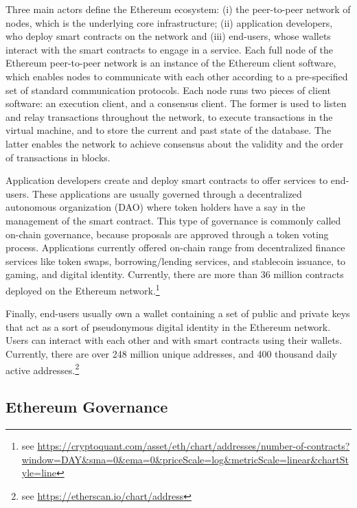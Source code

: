 \documentclass[No]{AEA}
\begin{document}
Three main actors define the Ethereum ecosystem: (i) the peer-to-peer network of nodes, which is the underlying core infrastructure; (ii) application developers, who deploy smart contracts on the network and (iii) end-users, whose wallets interact with the smart contracts to engage in a service.     
Each full node of the Ethereum peer-to-peer network is an instance of the Ethereum client software, which enables nodes to communicate with each other according to a pre-specified set of standard communication protocols. Each node runs two pieces of client software: an execution client, and a consensus client. The former is used to listen and relay transactions throughout the network, to execute transactions in the virtual machine, and to store the current and past state of the database. The latter enables the network to achieve consensus about the validity and the order of transactions in blocks. 

Application developers create and deploy smart contracts to offer services to end-users. These applications are usually governed through a decentralized autonomous organization (DAO) where token holders have a say in the management of the smart contract. This type of governance is commonly called on-chain governance, because proposals are approved through a token voting process. Applications currently offered on-chain range from decentralized finance services like token swaps, borrowing/lending services, and stablecoin issuance, to gaming, and digital identity. Currently, there are more than 36 million contracts deployed on the Ethereum network.\footnote{see \url{https://cryptoquant.com/asset/eth/chart/addresses/number-of-contracts?window=DAY&sma=0&ema=0&priceScale=log&metricScale=linear&chartStyle=line}}

Finally, end-users usually own a wallet containing a set of public and private keys that act as a sort of pseudonymous digital identity in the Ethereum network. Users can interact with each other and with smart contracts using their wallets. Currently, there are over 248 million unique addresses, and 400 thousand daily active addresses.\footnote{see \url{https://etherscan.io/chart/address}}

\subsection{Ethereum Governance} \label{subsec_eth_gov}
\end{document}
